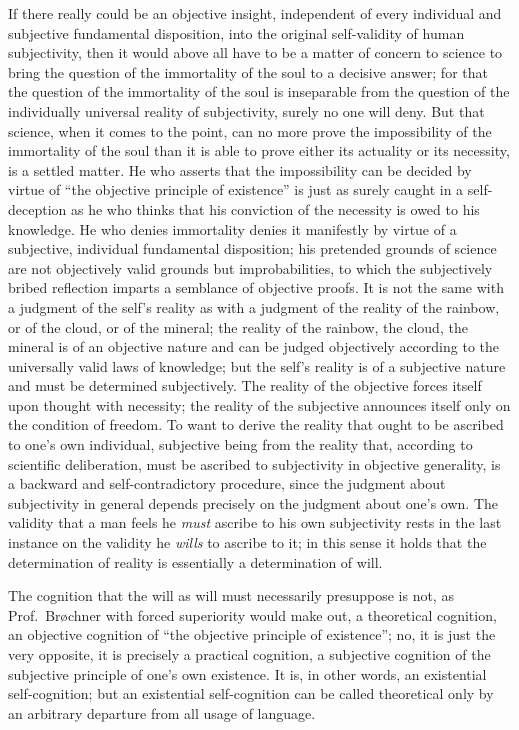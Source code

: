 \documentclass[12pt]{book}
\newcommand{\opage}[1]{\marginnote{\footnotesize\textit{[#1]}}}
\begin{document}
If there really could be an objective insight, independent of every
individual and subjective fundamental disposition, into the original
self-validity of human subjectivity, then it would above all have to be a
matter of concern to science to bring the question of the immortality of the
soul to a decisive answer; for that the question of the immortality of the
soul is inseparable from the question of the individually universal reality
of subjectivity, surely no one will deny. But that science, when it comes to
the point, can no more prove the impossibility of the immortality of the soul
than it is able to prove either its actuality or its necessity, is a settled
matter. He who asserts that the impossibility can be decided by virtue of
``the objective principle of existence'' is just as surely caught in a
self-deception as he who thinks that his conviction of the necessity is owed
to his knowledge. He who denies immortality denies it manifestly by virtue of
\opage{16}\setcounter{footnote}{0}%
a subjective, individual fundamental disposition; his pretended grounds of
science are not objectively valid grounds but improbabilities, to which the
subjectively bribed reflection imparts a semblance of objective proofs.
It is not the same with a judgment of the self's reality as with a
judgment of the reality of the rainbow, or of the cloud, or of the
mineral; the reality of the rainbow, the cloud, the mineral is of an
objective nature and can be judged objectively according to the
universally valid laws of knowledge; but the self's reality is of a
subjective nature and must be determined subjectively. The reality of the
objective forces itself upon thought with necessity; the reality of the
subjective announces itself only on the condition of freedom. To want to
derive the reality that ought to be ascribed to one's own individual,
subjective being from the reality that, according to scientific
deliberation, must be ascribed to subjectivity in objective generality, is
a backward and self-contradictory procedure, since the judgment about
subjectivity in general depends precisely on the judgment about one's
own. The validity that a man feels he \emph{must} ascribe to his own
subjectivity rests in the last instance on the validity he \emph{wills} to
ascribe to it; in this sense it holds that the determination of reality is
essentially a determination of will.

The cognition that the will as will must necessarily presuppose is not,
as Prof.\ Brøchner with forced superiority would make out, a theoretical
cognition, an objective cognition of ``the objective principle of existence'';
no, it is just the very opposite, it is precisely a practical cognition, a
subjective cognition of the subjective principle of one's own existence.
It is, in other words, an existential self-cognition; but an existential
self-cognition can be called theoretical only by an arbitrary departure
from all usage of language.
\end{document}

